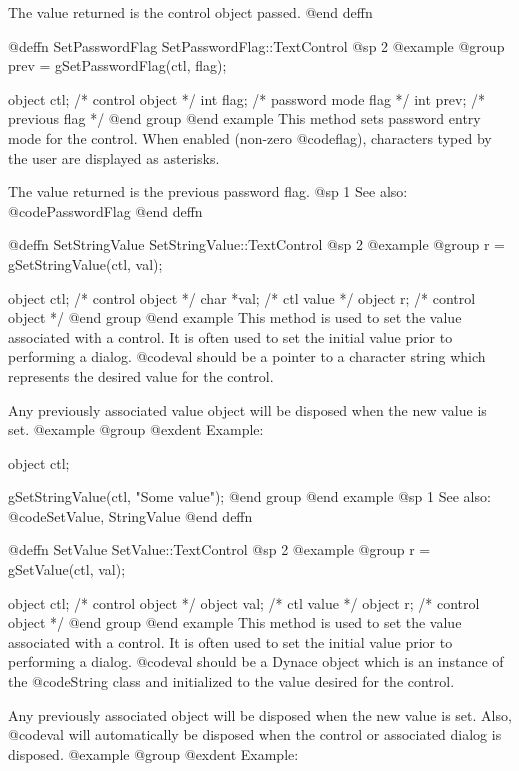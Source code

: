 The value returned is the control object passed.
@end deffn



@deffn {SetPasswordFlag} SetPasswordFlag::TextControl
@sp 2
@example
@group
prev = gSetPasswordFlag(ctl, flag);

object  ctl;    /*  control object     */
int     flag;   /*  password mode flag */
int     prev;   /*  previous flag      */
@end group
@end example
This method sets password entry mode for the control.  When enabled
(non-zero @code{flag}), characters typed by the user are displayed as
asterisks.

The value returned is the previous password flag.
@sp 1
See also:  @code{PasswordFlag}
@end deffn










@deffn {SetStringValue} SetStringValue::TextControl
@sp 2
@example
@group
r = gSetStringValue(ctl, val);

object  ctl;    /*  control object  */
char    *val;   /*  ctl value       */
object  r;      /*  control object  */
@end group
@end example
This method is used to set the value associated with a control.  It is
often used to set the initial value prior to performing a dialog.
@code{val} should be a pointer to a character string which represents
the desired value for the control.

Any previously associated value object will be disposed when the new
value is set.  
@example
@group
@exdent Example:

object  ctl;

gSetStringValue(ctl, "Some value");
@end group
@end example
@sp 1
See also:  @code{SetValue, StringValue}
@end deffn








@deffn {SetValue} SetValue::TextControl
@sp 2
@example
@group
r = gSetValue(ctl, val);

object  ctl;    /*  control object  */
object  val;    /*  ctl value       */
object  r;      /*  control object  */
@end group
@end example
This method is used to set the value associated with a control.  It is
often used to set the initial value prior to performing a dialog.
@code{val} should be a Dynace object which is an instance of the
@code{String} class and initialized to the value desired for the control.

Any previously associated object will be disposed when the new value is set.
Also, @code{val} will automatically be disposed when the control or associated
dialog is disposed.
@example
@group
@exdent Example:

